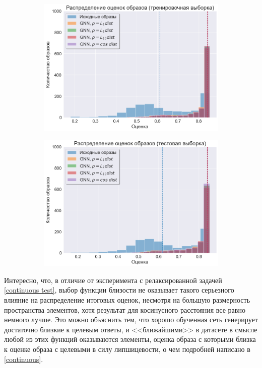 \documentclass[a4paper,14pt]{extarticle}
\begin{document}
				\begin{figure}[h!]
					\begin{subfigure}[b]{0.5\linewidth}
						\includegraphics[scale = 0.5]{../figures/GNN_at_least_5_subset1000_train.png}
					\end{subfigure}
					\hfill
					\begin{subfigure}[b]{0.5\linewidth}
						\includegraphics[scale = 0.5]{../figures/GNN_at_least_5_subset1000_test.png}
					\end{subfigure}
				\end{figure}
			
				Интересно, что, в отличие от эксперимента с релаксированной задачей \ref{continuous test}, выбор функции близости не оказывает такого серьезного влияние на распределение итоговых оценок, несмотря на большую размерность пространства элементов, хотя результат для косинусного расстояния все равно немного лучше. Это можно объяснить тем, что хорошо обученная сеть генерирует достаточно близкие к целевым ответы, и <<ближайшими>> в датасете в смысле любой из этих функций оказываются элементы, оценка образа с которыми близка к оценке образа с целевыми в силу липшицевости, о чем подробней написано в \ref{continuous}. 
				
\end{document}
